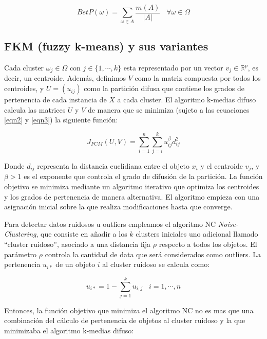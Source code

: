 \begin{equation}
BetP(\omega) = \sum_{\omega \in A} \frac{m(A)}{|A|} \;\;\; \forall \omega \in \Omega
\label{eqn7}
\end{equation}

\subsection{FKM (fuzzy k-means) y sus variantes}

Cada cluster $\omega_j \in \Omega$ con $j \in \{1,\cdots,k\}$ esta representado por un vector $v_j \in \mathbb{R}^p$, es decir, un centroide. Además, definimos $V$ como la matriz compuesta por todos los centroides, y $U = (u_{ij})$ como la partición difusa que contiene los grados de pertenencia de cada instancia de $X$ a cada cluster. El algoritmo k-medias difuso calcula las matrices $U$ y $V$ de manera que se minimiza (sujeto a las ecuaciones \ref{eqn2} y \ref{eqn3}) la siguiente función:

\begin{equation}
J_{FCM}(U,V) = \sum_{i=1}^{n}\sum_{j=i}^{k} u_{ij}^\beta d_{ij}^2
\label{eqn8}
\end{equation}

Donde $d_{ij}$ representa la distancia euclidiana entre el objeto $x_i$ y el centroide $v_j$, y $\beta > 1$ es el exponente que controla el grado de difusión de la partición. La función objetivo se minimiza mediante un algoritmo iterativo que optimiza los centroides y los grados de pertenencia de manera alternativa. El algoritmo empieza con una asignación inicial sobre la que realiza modificaciones hasta que converge.

Para detectar datos ruidosos u outliers empleamos el algoritmo NC \textit{Noise-Clustering}, que consiste en añadir a los $k$ clusters iniciales uno adicional llamado ``cluster ruidoso'', asociado a una distancia fija $\rho$ respecto a todos los objetos. El parámetro $\rho$ controla la cantidad de data que será considerados como outliers. La pertenencia $u_{i*}$ de un objeto $i$ al cluster ruidoso se calcula como:

\begin{equation}
u_{i*} = 1 - \sum_{j=1}^{k} u_{i,j} \;\;\; i = {1,\cdots,n}
\label{eqn9}
\end{equation}

Entonces, la función objetivo que minimiza el algoritmo NC no es mas que una combinación del cálculo de pertenencia de objetos al cluster ruidoso y la que minimizaba el algoritmo k-medias difuso:

